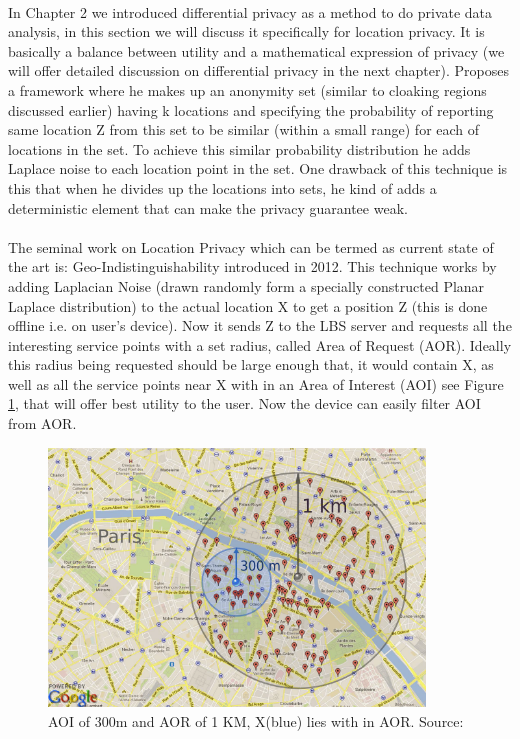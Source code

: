 \documentclass[12pt]{report}
\begin{document}
\paragraph{}
In Chapter 2 we introduced differential privacy as a method to do private data analysis, in this section we will discuss it specifically for location privacy. It is basically a balance between utility and a mathematical expression of privacy (we will offer detailed discussion on differential privacy in the next chapter).
\cite{dewri2013local} Proposes a framework where he makes up an anonymity set (similar to cloaking regions discussed earlier) having k locations and specifying the probability of reporting same location Z from this set to be similar (within a small range) for each of locations in the set. To achieve this similar probability distribution he adds Laplace noise to each location point in the set. One drawback of this technique is this that when he divides up the locations into sets, he kind of adds a deterministic element that can make the privacy guarantee weak. 
\paragraph{}
The seminal work on Location Privacy which can be termed as current state of the art is: Geo-Indistinguishability \cite{andres2013geo} introduced in 2012. This technique works by adding Laplacian Noise (drawn randomly form a specially constructed Planar Laplace distribution) to the actual location X to get a position Z (this is done offline i.e. on user's device). Now it sends Z to the LBS server and requests all the interesting service points with a set radius, called Area of Request (AOR). Ideally this radius being requested should be large enough that, it would contain X, as well as all the service points near X with in an Area of Interest (AOI) see Figure \ref{fig:AOIvsAOR}, that will offer best utility to the user. Now the device can easily filter AOI from AOR.
\begin{figure}[ht]
\centering
        \includegraphics[width=100mm,scale=1]{Images/AOIvsAOR.PNG}
    \caption{AOI of 300m and AOR of 1 KM, X(blue) lies with in AOR. Source:\cite{andres2013geo}}
    \label{fig:AOIvsAOR}
\end{figure}
\end{document}
